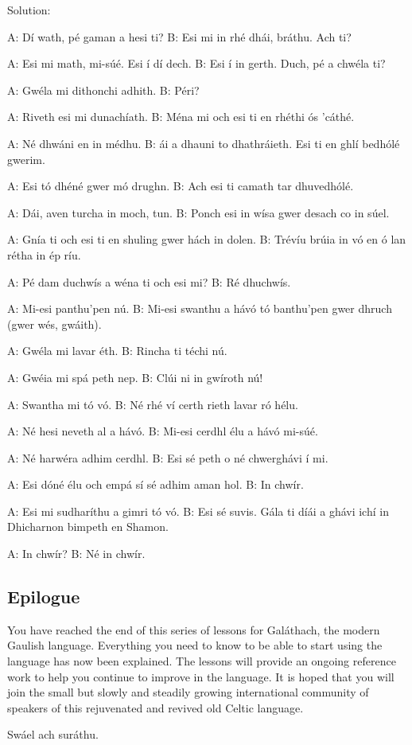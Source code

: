 \newpage
Solution:

A: D\'{i} wath, p\'{e} gaman a hesi ti?
B: Esi mi in rh\'{e} dh\'{a}i, br\'{a}thu. Ach ti?

A: Esi mi math, mi-s\'{u}\'{e}. Esi \'{i} d\'{i} dech.
B: Esi \'{i} in gerth. Duch, p\'{e} a chw\'{e}la ti?

A: Gw\'{e}la mi dithonchi adhith.
B: P\'{e}ri?

A: Riveth esi mi dunach\'{i}ath.
B: M\'{e}na mi och esi ti en rh\'{e}thi \'{o}s 'c\'{a}th\'{e}.

A: N\'{e} dhw\'{a}ni en in m\'{e}dhu.
B: \'{a}i a dhauni to dhathr\'{a}ieth. Esi ti en ghl\'{i} bedh\'{o}l\'{e} gwerim.

A: Esi t\'{o} dh\'{e}n\'{e} gwer m\'{o} drughn.
B: Ach esi ti camath tar dhuvedh\'{o}l\'{e}.

A: D\'{a}i, aven turcha in moch, tun.
B: Ponch esi in w\'{i}sa gwer desach co in s\'{u}el.

A: Gn\'{i}a ti och esi ti en shuling gwer h\'{a}ch in dolen.
B: Tr\'{e}v\'{i}u br\'{u}ia in v\'{o} en \'{o} lan r\'{e}tha in \'{e}p r\'{i}u.

A: P\'{e} dam duchw\'{i}s a w\'{e}na ti och esi mi?
B: R\'{e} dhuchw\'{i}s.

A: Mi-esi panthu'pen n\'{u}.
B: Mi-esi swanthu a h\'{a}v\'{o} t\'{o} banthu'pen gwer dhruch (gwer w\'{e}s, gw\'{a}ith).

A: Gw\'{e}la mi lavar \'{e}th.
B: Rincha ti t\'{e}chi n\'{u}.

A: Gw\'{e}ia mi sp\'{a} peth nep.
B: Cl\'{u}i ni in gw\'{i}roth n\'{u}!

A: Swantha mi t\'{o} v\'{o}.
B: N\'{e} rh\'{e} v\'{i} certh rieth lavar r\'{o} h\'{e}lu.

A: N\'{e} hesi neveth al a h\'{a}v\'{o}.
B: Mi-esi cerdhl \'{e}lu a h\'{a}v\'{o} mi-s\'{u}\'{e}.

A: N\'{e} harw\'{e}ra adhim cerdhl.
B: Esi s\'{e} peth o n\'{e} chwergh\'{a}vi \'{i} mi.

A: Esi d\'{o}n\'{e} \'{e}lu och emp\'{a} s\'{i} s\'{e} adhim aman hol.
B: In chw\'{i}r.

A: Esi mi sudhar\'{i}thu a gimri t\'{o} v\'{o}.
B: Esi s\'{e} suvis. G\'{a}la ti d\'{i}\'{a}i a gh\'{a}vi ich\'{i} in Dhicharnon bimpeth en Shamon.

A: In chw\'{i}r?
B: N\'{e} in chw\'{i}r.

\subsection{Epilogue}

You have reached the end of this series of lessons for Gal\'{a}thach, the modern Gaulish language. Everything you need to know to be able to start using the language has now been explained. The lessons will provide an ongoing reference work to help you continue to improve in the language. It is hoped that you will join the small but slowly and steadily growing international community of speakers of this rejuvenated and revived old Celtic language.

Sw\'{a}el ach sur\'{a}thu.
